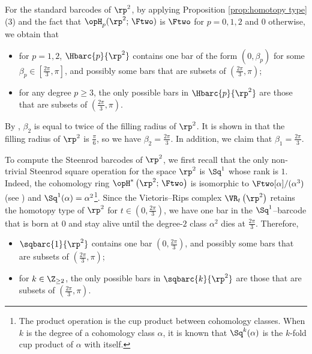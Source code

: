 \begin{example}
For the standard barcodes of $\rp^2$, by applying Proposition \ref{prop:homotopy type} (3) and the fact that $\opH_p(\rp^2;\,\Ftwo)$ is $\Ftwo$ for $p=0,1,2$ and $0$ otherwise, we obtain that 
\begin{itemize}
    \item for $p=1,2$, $\Hbarc{p}{\rp^2}$ contains one bar of the form $(0,\beta_p)$ for some $\beta_p\in [\frac{2\pi}{3},\pi]$, and possibly some bars that are subsets of $(\frac{2\pi}{3},\pi)$; 
    \item for any degree $p\geq 3$, the only possible bars in $\Hbarc{p}{\rp^2}$ are those that are subsets of $(\frac{2\pi}{3},\pi)$.
\end{itemize}
 By \cite[Proposition 9.4]{lim2020vietoris}, $\beta_2$ is equal to twice of the filling radius of $\rp^2$. It is shown in \cite[Theorem 1]{katz1983filling} that the filling radius of $\rp^2$ is $\frac{\pi}{6}$, so we have $\beta_2=\frac{2\pi}{3}$. In addition, we claim that $\beta_1=\frac{2\pi}{3}$. 

To compute the Steenrod barcodes of $\rp^2$, we first recall that the only non-trivial Steenrod square operation for the space $\rp^2$ is $\Sq^1$ whose rank is $1$. Indeed, the cohomology ring $\opH^*\left(\rp^2;\,\Ftwo\right)$ is isomorphic to $\Ftwo[\alpha]/(\alpha^3)$ (see \cite[Theorem 3.19]{hatcher2000}) and $\Sq^1(\alpha)=\alpha^2$\footnote{The product operation is the cup product between cohomology classes. When $k$ is the degree of a cohomology class $\alpha$, it is known that $\Sq^k(\alpha)$ is the $k$-fold cup product of $\alpha$ with itself.}. Since the Vietoris--Rips complex $\VR_t\left(\rp^2\right)$ retains the homotopy type of $\rp^2$ for $t\in (0,\frac{2\pi}{3})$, we have one bar in the $\Sq^1$--barcode that is born at $0$ and stay alive until the degree-$2$ class $\alpha^2$ dies at $\frac{2\pi}{3}$. Therefore, 
\begin{itemize}
    \item $\sqbarc{1}{\rp^2}$ contains one bar $(0,\frac{2\pi}{3})$, and possibly some bars that are subsets of $(\frac{2\pi}{3},\pi)$;
    \item for $k\in \Z_{\geq 2}$, the only possible bars in $\sqbarc{k}{\rp^2}$ are those that are subsets of $(\frac{2\pi}{3},\pi)$.
\end{itemize}


\end{example}
